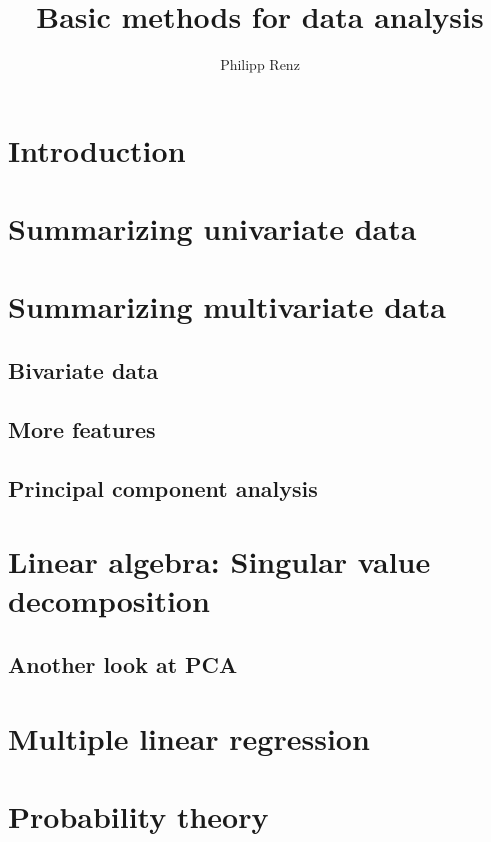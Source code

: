 \documentclass{article}
\title{Basic methods for data analysis}
\author{Philipp Renz}
\begin{document}
\maketitle
\tableofcontents
\section{Introduction}
\section{Summarizing univariate data}


\section{Summarizing multivariate data}
\subsection{Bivariate data}
\subsection{More features}
\subsection{Principal component analysis}
\section{Linear algebra: Singular value decomposition}
\subsection{Another look at PCA}
\section{Multiple linear regression}
\section{Probability theory}
\end{document}
